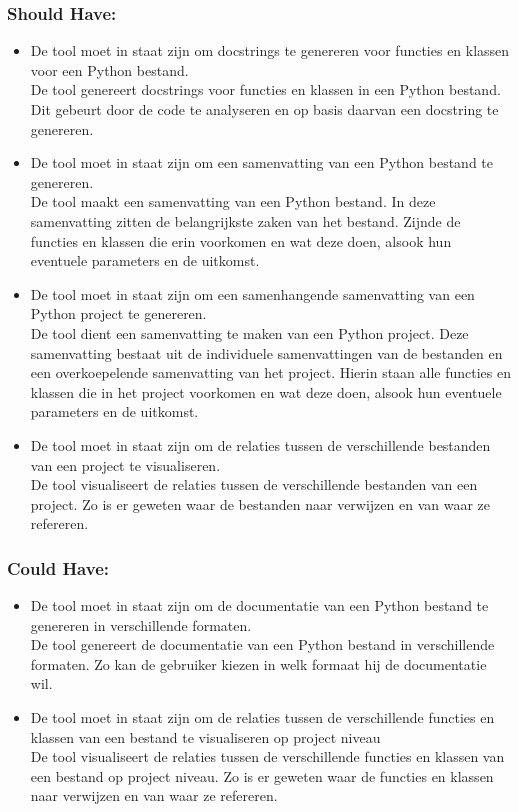 \subsubsection{Should Have:}
\begin{itemize}
    \item De tool moet in staat zijn om docstrings te genereren voor functies en klassen voor een Python bestand.\\
    De tool genereert docstrings voor functies en klassen in een Python bestand. Dit gebeurt door de code te analyseren en op basis daarvan een docstring te genereren.
    \item De tool moet in staat zijn om een samenvatting van een Python bestand te genereren.\\
    De tool maakt een samenvatting van een Python bestand. In deze samenvatting zitten de belangrijkste zaken van het bestand.
    Zijnde de functies en klassen die erin voorkomen en wat deze doen, alsook hun eventuele parameters en de uitkomst.
    \item De tool moet in staat zijn om een samenhangende samenvatting van een Python project te genereren.\\
    De tool dient een samenvatting te maken van een Python project. Deze samenvatting bestaat uit de individuele samenvattingen van de bestanden en een overkoepelende samenvatting van het project.
    Hierin staan alle functies en klassen die in het project voorkomen en wat deze doen, alsook hun eventuele parameters en de uitkomst.
    \item De tool moet in staat zijn om de relaties tussen de verschillende bestanden van een project te visualiseren.\\
    De tool visualiseert de relaties tussen de verschillende bestanden van een project. Zo is er geweten waar de bestanden naar verwijzen en van waar ze refereren.
\end{itemize}

\subsubsection{Could Have:}
\begin{itemize}
    \item De tool moet in staat zijn om de documentatie van een Python bestand te genereren in verschillende formaten.\\
    De tool genereert de documentatie van een Python bestand in verschillende formaten. Zo kan de gebruiker kiezen in welk formaat hij de documentatie wil.
    \item De tool moet in staat zijn om de relaties tussen de verschillende functies en klassen van een bestand te visualiseren op project niveau\\
    De tool visualiseert de relaties tussen de verschillende functies en klassen van een bestand op project niveau. Zo is er geweten waar de functies en klassen naar verwijzen en van waar ze refereren.
\end{itemize}

